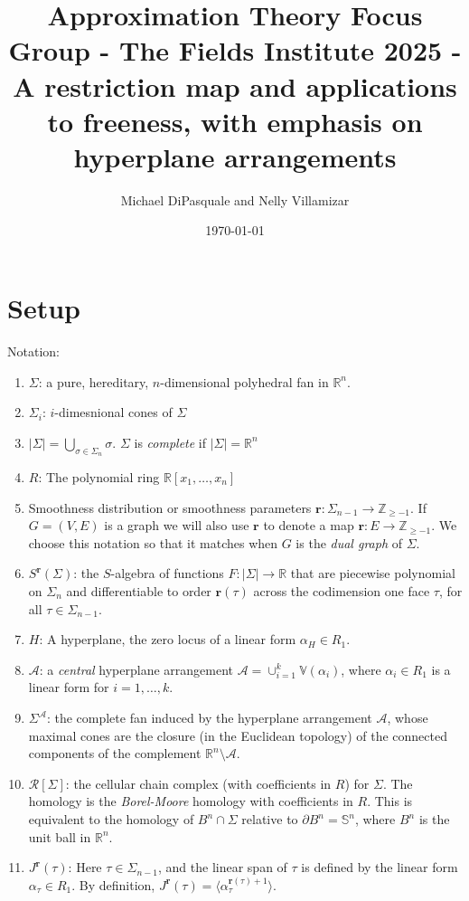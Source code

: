 \documentclass[11pt, reqno]{amsart}
\title{Approximation Theory Focus Group - The Fields Institute 2025 - A restriction map and applications to freeness, with emphasis on hyperplane arrangements}
\author{Michael DiPasquale and Nelly Villamizar}
\date{\today}
\newcommand{\RR}{\mathbb{R}}
\newcommand{\R}{\mathbb{R}}
\newcommand{\ZZ}{\mathbb{Z}}
\newcommand{\br}{\mathbf{r}}
\newcommand{\calR}{\mathcal{R}}
\newcommand{\A}{\mathcal{A}}
\theoremstyle{definition}
\theoremstyle{remark}
\numberwithin{equation}{section}
\begin{document}
\maketitle

\section{Setup}

Notation:
\begin{enumerate}
\item $\Sigma$: a pure, hereditary, $n$-dimensional polyhedral fan in $\RR^n$.
\item $\Sigma_i$: $i$-dimesnional cones of $\Sigma$
\item $|\Sigma|=\bigcup_{\sigma\in\Sigma_n}\sigma$.
$\Sigma$ is \textit{complete} if $|\Sigma|=\RR^n$
\item $R$: The polynomial ring $\RR[x_1,\ldots,x_n]$
\item Smoothness distribution or smoothness parameters $\br:\Sigma_{n-1}\to \ZZ_{\ge -1}$.  If $G=(V,E)$ is a graph we will also use $\br$ to denote a map $\br:E\to \ZZ_{\ge -1}$.  We choose this notation so that it matches when $G$ is the \textit{dual graph} of $\Sigma$.
\item $S^\br(\Sigma)$: the $S$-algebra of functions $F:|\Sigma|\to \RR$ that are piecewise polynomial on $\Sigma_n$ and differentiable to order $\br(\tau)$ across the codimension one face $\tau$, for all $\tau\in\Sigma_{n-1}$.
\item $H$: A hyperplane, the zero locus of a linear form $\alpha_H\in R_1$.
\item $\A$: a \textit{central} hyperplane arrangement $\A=\cup_{i=1}^k \mathbb{V}(\alpha_i)$, where $\alpha_i\in R_1$ is a linear form for $i=1,\ldots,k$.
\item $\Sigma^\A$: the complete fan induced by the hyperplane arrangement $\A$, whose maximal cones are the closure (in the Euclidean topology) of the connected components of the complement $\R^n\setminus\A$.
\item $\calR[\Sigma]$: the cellular chain complex (with coefficients in $R$) for $\Sigma$.  The homology is the \textit{Borel-Moore} homology with coefficients in $R$.  This is equivalent to the homology of $B^n\cap\Sigma$ relative to $\partial B^n=\mathbb{S}^n$, where $B^n$ is the unit ball in $\R^n$.
\item $J^{\br}(\tau)$: Here $\tau\in\Sigma_{n-1}$, and the linear span of $\tau$ is defined by the linear form $\alpha_\tau\in R_1$.  By definition, $J^{\br}(\tau)=\langle \alpha_\tau^{\br(\tau)+1}\rangle$.

\end{enumerate}
\end{document}
